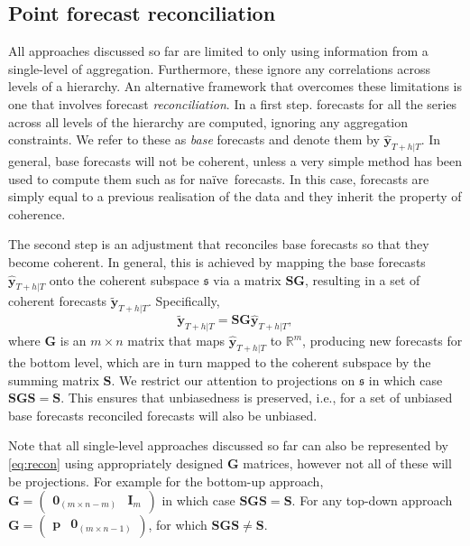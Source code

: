 \documentclass[a4paper, 11pt]{article}
\def\naive{na\"{i}ve\ }
\begin{document}
\subsection{Point forecast reconciliation}\label{sec:reconciliation approaches}

All approaches discussed so far are limited to only using information from a single-level of aggregation. Furthermore, these ignore any correlations across levels of a hierarchy. An alternative framework that overcomes these limitations is one that involves forecast \textit{reconciliation}. In a first step. forecasts for all the series across all levels of the hierarchy are computed, ignoring any aggregation constraints. We refer to these as \textit{base} forecasts and denote them by $\hat{\bm{y}}_{T+h|T}$. In general, base forecasts will not be coherent, unless a very simple method has been used to compute them such as for \naive forecasts. In this case, forecasts are simply equal to a previous realisation of the data and they inherit the property of coherence.

The second step is an adjustment that reconciles base forecasts so that they become coherent. In general, this is achieved by mapping the base forecasts $\hat{\bm{y}}_{T+h|T}$ onto the coherent subspace $\mathfrak{s}$ via a matrix $\bm{S}\bm{G}$, resulting in a set of coherent forecasts $\tilde{\bm{y}}_{T+h|T}$. Specifically,
\begin{equation}\label{eq:recon}
\tilde{\bm{y}}_{T+h|T}=\bm{S}\bm{G}\hat{\bm{y}}_{T+h|T},
\end{equation}
where $\bm{G}$ is an $m\times n$ matrix that maps $\hat{\bm{y}}_{T+h|T}$ to $\mathbb{R}^m$, producing new forecasts for the bottom level, which are in turn mapped to the coherent subspace by the summing matrix $\bm{S}$. We restrict our attention to projections on $\mathfrak{s}$ in which case $\bm{S}\bm{G}\bm{S}=\bm{S}$. This ensures that unbiasedness is preserved, i.e., for a set of unbiased base forecasts reconciled forecasts will also be unbiased.

Note that all single-level approaches discussed so far can also be represented by \eqref{eq:recon} using appropriately designed $\bm{G}$ matrices, however not all of these will be projections. For example for the bottom-up approach, $\bm{G}=\begin{pmatrix}
\bm{0}_{(m \times n-m)} & \bm{I}_m
\end{pmatrix}$ in which case $\bm{S}\bm{G}\bm{S}=\bm{S}$. For any top-down approach
$\bm{G}=\begin{pmatrix}
\bm{p} & \bm{0}_{(m \times n-1)}
\end{pmatrix}$, for which $\bm{S}\bm{G}\bm{S}\ne\bm{S}$.
\end{document}
